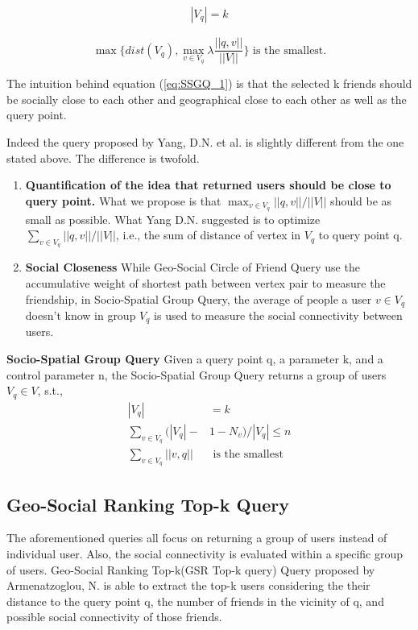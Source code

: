 \begin{align} 
|V_q| = k 
\end{align}

\begin{equation} \label{eq:SSGQ_1}
\max \{dist(V_q), \max_{v \in V_q} \lambda \frac{||q,v||}{||V||}\} \mbox{ is the smallest.} 
\end{equation}

The intuition behind equation (\ref{eq:SSGQ_1}) is that the selected k friends should be socially close to each other and geographical close to each other as well as the query point.

Indeed the query proposed by Yang, D.N. et al. \cite{Yang} is slightly different from the one stated above. The difference is twofold. 
\begin{enumerate}
\item \textbf{Quantification of the idea that returned users should be close to query point.} What we propose is that $\max_{v \in V_q} ||q,v|| / ||V||$ should be as small as possible. What Yang D.N. \cite{Yang} suggested is to optimize $\sum_{v \in V_q} ||q,v|| / ||V||$, i.e., the sum of distance of vertex in $V_q$ to query point q.

\item \textbf{Social Closeness} While Geo-Social Circle of Friend Query use the accumulative weight of shortest path between vertex pair to measure the friendship, in Socio-Spatial Group Query, the average of people a user $v \in V_q$ doesn't know in group $V_q$ is used to measure the social connectivity between users.
\end{enumerate}

\textbf{Socio-Spatial Group Query}
Given a query point q, a parameter k, and a control parameter n, the Socio-Spatial Group Query returns a group of users $V_q \in V$, s.t.,
\begin{align}
|V_q| & = k \\
\sum_{v \in V_q} (|V_q| - & 1 - N_v) / |V_q| \le n \\
\sum_{v \in V_q} ||v,q|| & \mbox{ is the smallest}
\end{align}

\subsection{Geo-Social Ranking Top-k Query}
The aforementioned queries all focus on returning a group of users instead of individual user. Also, the social connectivity is evaluated within a specific group of users. Geo-Social Ranking Top-k(GSR Top-k query) Query proposed by Armenatzoglou, N. \cite{Nikos} is able to extract the top-k users considering the their distance to the query point q, the number of friends in the vicinity of q, and possible social connectivity of those friends. 

